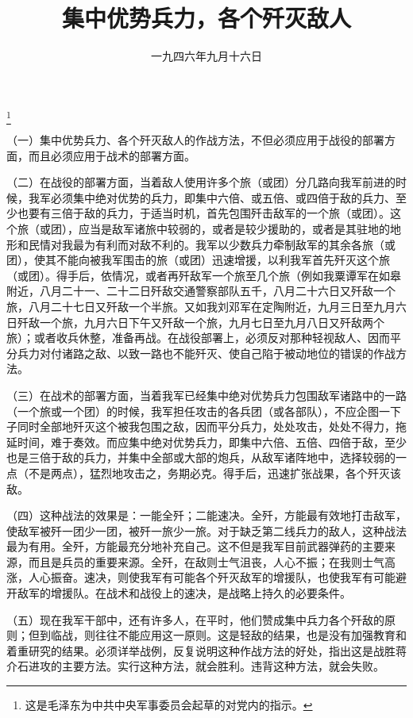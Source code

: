 
\title{集中优势兵力，各个歼灭敌人}
\date{一九四六年九月十六日}
\thanks{这是毛泽东为中共中央军事委员会起草的对党内的指示。}
\maketitle


（一）集中优势兵力、各个歼灭敌人的作战方法，不但必须应用于战役的部署方面，而且必须应用于战术的部署方面。

（二）在战役的部署方面，当着敌人使用许多个旅（或团）分几路向我军前进的时候，我军必须集中绝对优势的兵力，即集中六倍、或五倍、或四倍于敌的兵力、至少也要有三倍于敌的兵力，于适当时机，首先包围歼击敌军的一个旅（或团）。这个旅（或团），应当是敌军诸旅中较弱的，或者是较少援助的，或者是其驻地的地形和民情对我最为有利而对敌不利的。我军以少数兵力牵制敌军的其余各旅（或团），使其不能向被我军围击的旅（或团）迅速增援，以利我军首先歼灭这个旅（或团）。得手后，依情况，或者再歼敌军一个旅至几个旅（例如我粟谭军在如皋附近，八月二十一、二十二日歼敌交通警察部队五千，八月二十六日又歼敌一个旅，八月二十七日又歼敌一个半旅。又如我刘邓军在定陶附近，九月三日至九月六日歼敌一个旅，九月六日下午又歼敌一个旅，九月七日至九月八日又歼敌两个旅）；或者收兵休整，准备再战。在战役部署上，必须反对那种轻视敌人、因而平分兵力对付诸路之敌、以致一路也不能歼灭、使自己陷于被动地位的错误的作战方法。

（三）在战术的部署方面，当着我军已经集中绝对优势兵力包围敌军诸路中的一路（一个旅或一个团）的时候，我军担任攻击的各兵团（或各部队），不应企图一下子同时全部地歼灭这个被我包围之敌，因而平分兵力，处处攻击，处处不得力，拖延时间，难于奏效。而应集中绝对优势兵力，即集中六倍、五倍、四倍于敌，至少也是三倍于敌的兵力，并集中全部或大部的炮兵，从敌军诸阵地中，选择较弱的一点（不是两点），猛烈地攻击之，务期必克。得手后，迅速扩张战果，各个歼灭该敌。

（四）这种战法的效果是：一能全歼；二能速决。全歼，方能最有效地打击敌军，使敌军被歼一团少一团，被歼一旅少一旅。对于缺乏第二线兵力的敌人，这种战法最为有用。全歼，方能最充分地补充自己。这不但是我军目前武器弹药的主要来源，而且是兵员的重要来源。全歼，在敌则士气沮丧，人心不振；在我则士气高涨，人心振奋。速决，则使我军有可能各个歼灭敌军的增援队，也使我军有可能避开敌军的增援队。在战术和战役上的速决，是战略上持久的必要条件。

（五）现在我军干部中，还有许多人，在平时，他们赞成集中兵力各个歼敌的原则；但到临战，则往往不能应用这一原则。这是轻敌的结果，也是没有加强教育和着重研究的结果。必须详举战例，反复说明这种作战方法的好处，指出这是战胜蒋介石进攻的主要方法。实行这种方法，就会胜利。违背这种方法，就会失败。

